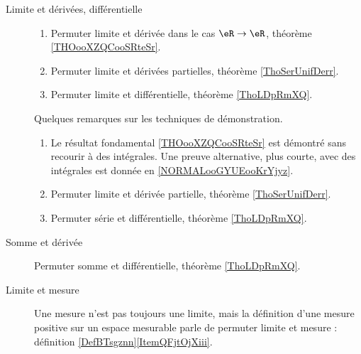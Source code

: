 \begin{description}
	\item[Limite et dérivées, différentielle]
	      \begin{enumerate}
		      \item
		            Permuter limite et dérivée dans le cas \( \eR\to \eR\), théorème \ref{THOooXZQCooSRteSr}.
		      \item
		            Permuter limite et dérivées partielles, théorème \ref{ThoSerUnifDerr}.
		      \item
		            Permuter limite et différentielle, théorème \ref{ThoLDpRmXQ}.
	      \end{enumerate}
	      Quelques remarques sur les techniques de démonstration.
	      \begin{enumerate}
		      \item
		            Le résultat fondamental \ref{THOooXZQCooSRteSr} est démontré sans recourir à des intégrales. Une preuve alternative, plus courte, avec des intégrales est donnée en \ref{NORMALooGYUEooKrYjyz}.
		      \item
		            Permuter limite et dérivée partielle, théorème \ref{ThoSerUnifDerr}.
		      \item
		            Permuter série et différentielle, théorème \ref{ThoLDpRmXQ}.
	      \end{enumerate}
	\item[Somme et dérivée]
	      Permuter somme et différentielle, théorème \ref{ThoLDpRmXQ}.
	\item[Limite et mesure]
	      Une mesure n'est pas toujours une limite, mais la définition d'une mesure positive sur un espace mesurable parle de permuter limite et mesure : définition \ref{DefBTsgznn}\ref{ItemQFjtOjXiii}.
\end{description}
